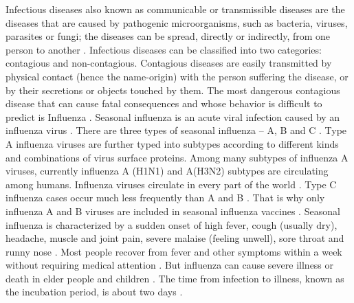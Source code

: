 Infectious diseases also known as communicable or transmissible diseases are the diseases that are caused by pathogenic microorganisms, such as bacteria, viruses, parasites or fungi; the diseases can be spread, directly or indirectly, from one person to another \cite{per3}. Infectious diseases can be classified into two categories: contagious and non-contagious. Contagious diseases are easily transmitted by physical contact (hence the name-origin) with the person suffering the disease, or by their secretions or objects touched by them. \cite{per3}The most dangerous contagious disease that can cause fatal consequences and whose behavior is difficult to predict is Influenza \cite{per3}. Seasonal influenza is an acute viral infection caused by an influenza virus \cite{per3}. There are three types of seasonal influenza – A, B and C \cite{per1}. Type A influenza viruses are further typed into subtypes according to different kinds and combinations of virus surface proteins. Among many subtypes of influenza A viruses, currently influenza A (H1N1) and A(H3N2) subtypes are circulating among humans. Influenza viruses circulate in every part of the world \cite{per1}. Type C influenza cases occur much less frequently than A and B \cite{per1}. That is why only influenza A and B viruses are included in seasonal influenza vaccines \cite{per1}. Seasonal influenza is characterized by a sudden onset of high fever, cough (usually dry), headache, muscle and joint pain, severe malaise (feeling unwell), sore throat and runny nose \cite{per3}. Most people recover from fever and other symptoms within a week without requiring medical attention \cite{per3}. But influenza can cause severe illness or death in elder people and children \cite{per3}. The time from infection to illness, known as the incubation period, is about two days \cite{per3}.


